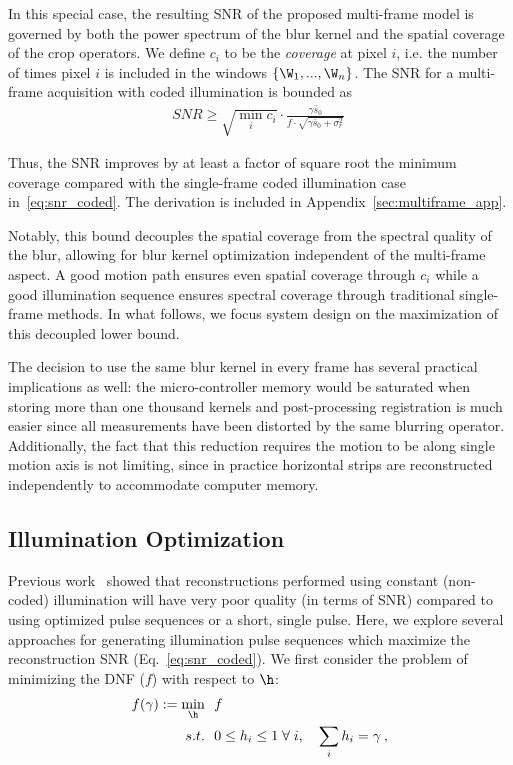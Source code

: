 In this special case, the resulting SNR of the proposed multi-frame model is governed by both the power spectrum of the blur kernel and the spatial coverage of the crop operators. We define $c_i$ to be the \textit{coverage} at pixel $i$, i.e. the number of times pixel $i$ is included in the windows $\{\W_1,...,\W_n\}$.
The SNR for a multi-frame acquisition with coded illumination is bounded as
\begin{align*}
    SNR  \geq \sqrt{
    \min_{i} c_i}  \cdot \frac{ \gamma\bar{s}_0}{f\cdot \sqrt{\gamma\bar{s}_0 + \sigma^2_{r}}}\:
\end{align*}

Thus, the SNR improves by at least a factor of square root the minimum coverage compared with the single-frame coded illumination case in~\eqref{eq:snr_coded}. The derivation is included in Appendix~\ref{sec:multiframe_app}.

Notably, this bound decouples the spatial coverage from the spectral quality of the blur, allowing for blur kernel optimization independent of the multi-frame aspect. A good motion path ensures even spatial coverage through $c_i$ while a good illumination sequence ensures spectral coverage through traditional single-frame methods. In what follows, we focus system design on the maximization of this decoupled lower bound.

The decision to use the same blur kernel in every frame has several practical implications as well: the micro-controller memory would be saturated when storing more than one thousand kernels and post-processing registration is much easier since all measurements have been distorted by the same blurring operator. Additionally, the fact that this reduction requires the motion to be along single motion axis is not limiting, since in practice horizontal strips are reconstructed independently to accommodate computer memory.

\subsection{Illumination Optimization}\label{sec:illum_opt}
Previous work~\cite{raskar2006coded, agrawal2009optimal} showed that reconstructions performed using constant (non-coded) illumination will have very poor quality (in terms of SNR) compared to using optimized pulse sequences or a short, single pulse. Here, we explore several approaches for generating illumination pulse sequences which maximize the reconstruction SNR (Eq.~\ref{eq:snr_coded}). We first consider the problem of minimizing the DNF ($f$) with respect to $\h$:
\begin{align}
    \begin{split}
        \label{eq:illum_opt_single}
        f(\gamma) := \min_{\h}&~~ f \\
          s.t. &~~0 \leq h_i \leq 1 \; \forall \; i, \quad
          \sum_{i} h_i = \gamma \:,
    \end{split}
\end{align}

